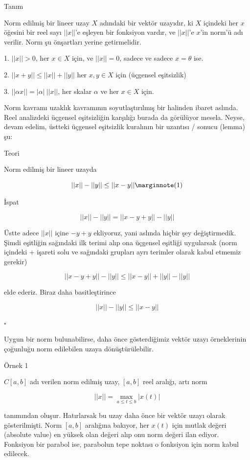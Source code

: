\documentclass[12pt,fleqn]{article}\usepackage{../../common}
\begin{document}
Tanım

Norm edilmiş bir lineer uzay $X$ adındaki bir vektör uzayıdır, ki $X$
içindeki her $x$ öğesini bir reel sayı $||x||$'e eşleyen bir fonksiyon
vardır, ve $||x||$'e $x$'in norm'ü adı verilir. Norm şu önşartları yerine
getirmelidir. 

1. $||x|| > 0$, her $x \in X$ için, ve $||x|| = 0$, sadece ve sadece $x =
\theta$ ise. 

2. $||x+y|| \le ||x|| + ||y||$ her $x,y \in X$ için (üçgensel eşitsizlik) 

3. $||\alpha x|| = |\alpha| \ ||x||$, her skalar $\alpha$ ve her $x \in X$ için. 

Norm kavramı uzaklık kavramının soyutlaştırılmış bir halinden ibaret
aslında. Reel analizdeki üçgensel eşitsizliğin karşılığı burada da
görülüyor mesela. Neyse, devam edelim, üstteki üçgensel eşitsizlik
kuralının bir uzantısı / sonucu (lemma) şu:

Teori 

Norm edilmiş bir lineer uzayda 

$$ ||x|| - ||y|| \le ||x-y|| 
\mlabel{1}
$$

İspat

$$ ||x|| - ||y|| = ||x - y + y|| - ||y||$$

Üstte adece $||x||$ içine $-y+y$ ekliyoruz, yani aslında hiçbir şey
değiştirmedik. Şimdi eşitliğin sağındaki ilk terimi alıp ona üçgensel
eşitliği uygularsak (norm içindeki $+$ işareti solu ve sağındaki grupları
ayrı terimler olarak kabul etmemiz gerekir)

$$ ||x - y + y|| - ||y|| \le
||x - y || + ||y|| - ||y|| 
$$

elde ederiz. Biraz daha basitleştirince

$$ ||x|| - ||y||  \le ||x - y ||  $$

$\square$

Uygun bir norm bulunabilirse, daha önce gösterdiğimiz vektör uzayı
örneklerinin çoğunluğu norm edilebilen uzaya dönüştürülebilir.

Örnek 1

$C[a,b]$ adı verilen norm edilmiş uzay, $[a,b]$ reel aralığı, artı norm

$$ ||x|| = \max_{a \le t \le b} |x(t)| $$

tanımından oluşur. Hatırlarsak bu uzay daha önce bir vektör uzayı olarak
gösterilmişti. Norm $[a,b]$ aralığına bakıyor, her $x(t)$ için mutlak değeri
(absolute value) en yüksek olan değeri alıp onu norm değeri ilan
ediyor. Fonksiyon bir parabol ise, parabolun tepe noktası o fonksiyon için
norm kabul edilecek. 
\end{document}
